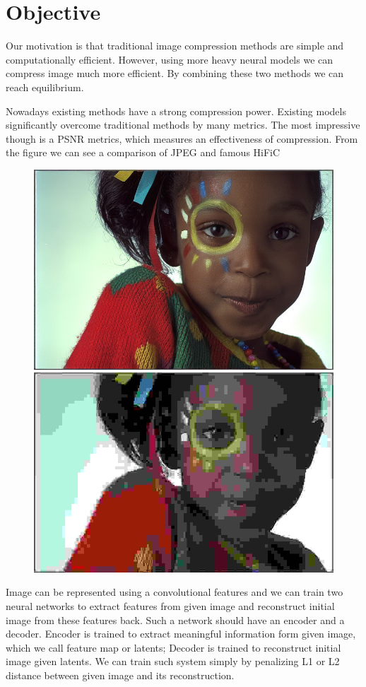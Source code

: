 \chapter{Objective}

Our motivation is that traditional image compression methods are simple and computationally efficient. However, using more heavy neural models we can compress image much more efficient. By combining these two methods we can reach equilibrium.

Nowadays existing methods have a strong compression power. Existing models significantly overcome traditional methods by many metrics. The most impressive though is a PSNR metrics, which measures an effectiveness of compression. From the figure we can see a comparison of JPEG and famous HiFiC \cite{mentzer_high_fidelity_2020}

\begin{figure}[!ht]
    \centering
    \includegraphics[width=.45\textwidth]{figure/kodim15_HiFiC_Lo.png}
    \includegraphics[width=.45\textwidth]{figure/kodim15_jpg_1x_0.166.jpg}
    \caption{}
    \label{jpeg-hific-comparision}
\end{figure}

Image can be represented using a convolutional features and we can train two neural networks to extract features from given image and reconstruct initial image from these features back. Such a network should have an encoder and a decoder. Encoder is trained to extract meaningful information form given image, which we call feature map or latents; Decoder is trained to reconstruct initial image given latents. We can train such system simply by penalizing L1 or L2 distance between given image and its reconstruction.

